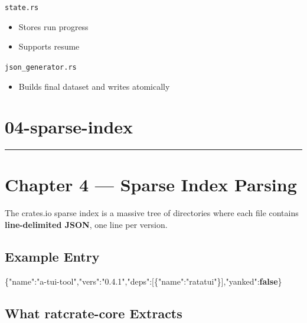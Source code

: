 \documentclass[
  letterpaper,
  DIV=11,
  numbers=noendperiod]{scrreprt}
\newenvironment{Shaded}{\begin{snugshade}}{\end{snugshade}}
\newcommand{\DataTypeTok}[1]{\textcolor[rgb]{0.68,0.00,0.00}{#1}}
\newcommand{\FunctionTok}[1]{\textcolor[rgb]{0.28,0.35,0.67}{#1}}
\newcommand{\KeywordTok}[1]{\textcolor[rgb]{0.00,0.23,0.31}{\textbf{#1}}}
\newcommand{\OtherTok}[1]{\textcolor[rgb]{0.00,0.23,0.31}{#1}}
\newcommand{\StringTok}[1]{\textcolor[rgb]{0.13,0.47,0.30}{#1}}
\providecommand{\tightlist}{%
  \setlength{\itemsep}{0pt}\setlength{\parskip}{0pt}}
\begin{document}
\texttt{state.rs}

\begin{itemize}
\item[$\square$]
  Stores run progress
\item[$\square$]
  Supports resume
\end{itemize}

\texttt{json\_generator.rs}

\begin{itemize}
\tightlist
\item[$\square$]
  Builds final dataset and writes atomically
\end{itemize}

\chapter{04-sparse-index}\label{sparse-index}

\begin{center}\rule{0.5\linewidth}{0.5pt}\end{center}

\chapter{Chapter 4 --- Sparse Index
Parsing}\label{chapter-4-sparse-index-parsing}

The crates.io sparse index is a massive tree of directories where each
file contains \textbf{line-delimited JSON}, one line per version.

\section{Example Entry}\label{example-entry}

\begin{Shaded}
\begin{Highlighting}[]
\FunctionTok{\{}\DataTypeTok{"name"}\FunctionTok{:}\StringTok{"a{-}tui{-}tool"}\FunctionTok{,}\DataTypeTok{"vers"}\FunctionTok{:}\StringTok{"0.4.1"}\FunctionTok{,}\DataTypeTok{"deps"}\FunctionTok{:}\OtherTok{[}\FunctionTok{\{}\DataTypeTok{"name"}\FunctionTok{:}\StringTok{"ratatui"}\FunctionTok{\}}\OtherTok{]}\FunctionTok{,}\DataTypeTok{"yanked"}\FunctionTok{:}\KeywordTok{false}\FunctionTok{\}}
\end{Highlighting}
\end{Shaded}

\section{What ratcrate-core Extracts}\label{what-ratcrate-core-extracts}
\end{document}
